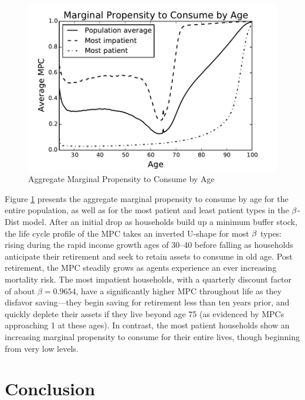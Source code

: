 \documentclass[12pt,titlepage]{econtex}
\begin{document}
\begin{figure}
  \caption{Aggregate Marginal Propensity to Consume by Age}
  \label{fig:MPCbyAge}
  \begin{center}
    \includegraphics[scale=1.25]{./Figures/MPCbyAge}
  \end{center}
\end{figure}

Figure \ref{fig:MPCbyAge} presents the aggregate marginal propensity to consume by age for the entire population, as well as for the most patient and least patient types in the $\beta$-Dist model.  After an initial drop as households build up a minimum buffer stock, the life cycle profile of the MPC takes an inverted U-shape for most $\beta$ types: rising during the rapid income growth ages of 30--40 before falling as households anticipate their retirement and seek to retain assets to consume in old age.  Post retirement, the MPC steadily grows as agents experience an ever increasing mortality risk.  The most impatient households, with a quarterly discount factor of about $\beta = 0.9654$, have a significantly higher MPC throughout life as they disfavor saving---they begin saving for retirement less than ten years prior, and quickly deplete their assets if they live beyond age 75 (as evidenced by MPCs approaching 1 at these ages).  In contrast, the most patient households show an increasing marginal propensity to consume for their entire lives, though beginning from very low levels.

\section{Conclusion}\label{sec:Conclusion}
\end{document}
